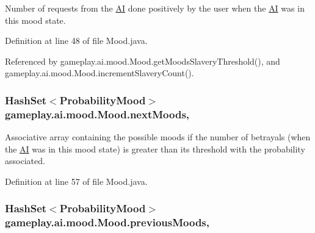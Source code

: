Number of requests from the \hyperlink{classgameplay_1_1ai_1_1_a_i}{A\-I} done positively by the user when the \hyperlink{classgameplay_1_1ai_1_1_a_i}{A\-I} was in this mood state. 



Definition at line 48 of file Mood.\-java.



Referenced by gameplay.\-ai.\-mood.\-Mood.\-get\-Moods\-Slavery\-Threshold(), and gameplay.\-ai.\-mood.\-Mood.\-increment\-Slavery\-Count().

\hypertarget{classgameplay_1_1ai_1_1mood_1_1_mood_af19cdc9b24293b9d7898d66720b8e0e7}{
\subsubsection[{next\-Moods}]{\setlength{\rightskip}{0pt plus 5cm}Hash\-Set$<${\bf Probability\-Mood}$>$ gameplay.\-ai.\-mood.\-Mood.\-next\-Moods\hspace{0.3cm}{\ttfamily [protected]}, {\ttfamily [inherited]}}}\label{classgameplay_1_1ai_1_1mood_1_1_mood_af19cdc9b24293b9d7898d66720b8e0e7}


Associative array containing the possible moods if the number of betrayals (when the \hyperlink{classgameplay_1_1ai_1_1_a_i}{A\-I} was in this mood state) is greater than its threshold with the probability associated. 



Definition at line 57 of file Mood.\-java.

\hypertarget{classgameplay_1_1ai_1_1mood_1_1_mood_a5c8758b18bb740a2fd1edf8d57a5ab27}{
\subsubsection[{previous\-Moods}]{\setlength{\rightskip}{0pt plus 5cm}Hash\-Set$<${\bf Probability\-Mood}$>$ gameplay.\-ai.\-mood.\-Mood.\-previous\-Moods\hspace{0.3cm}{\ttfamily [protected]}, {\ttfamily [inherited]}}}\label{classgameplay_1_1ai_1_1mood_1_1_mood_a5c8758b18bb740a2fd1edf8d57a5ab27}


